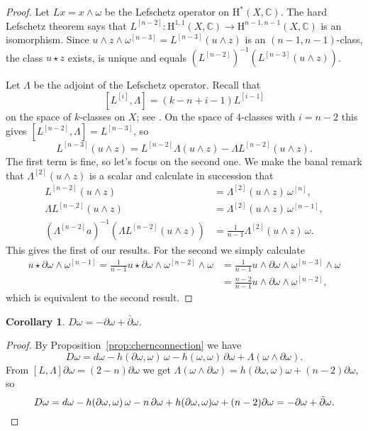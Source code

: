 \documentclass[11pt,a4paper]{amsart}
\newtheorem{coro}[theo]{Corollary}
\theoremstyle{definition}
\theoremstyle{remark}
\newcommand{\CC}{\mathbb{C}}
\def\d{\partial}
\def\dbar{\bar\partial}
\def\coho#1{\mathrm{H}^{#1}}
\def\chern{D}
\def\kf{\omega}
\def\ton{u}
\def\tth{z}
\def\^#1{^{[#1]}}
\begin{document}
\begin{proof}
Let $L x = x \wedge \kf$ be the Lefschetz operator on $\coho{*}(X,\CC)$.
The hard Lefschetz theorem says that $L\^{n-2} : \coho{1,1}(X,\CC) \to
\coho{n-1,n-1}(X,\CC)$ is an isomorphism. Since $\ton \wedge \tth \wedge
\kf\^{n-3} = L\^{n-3}(\ton \wedge \tth)$ is an $(n-1,n-1)$-class, the
class $\ton \star \tth$ exists, is unique and equals
$(L\^{n-2})^{-1}(L\^{n-3}(\ton \wedge \tth))$.

Let $\Lambda$ be the adjoint of the Lefschetz operator. Recall that
$$
[L\^i, \Lambda] = (k - n + i - 1) L\^{i-1}
$$
on the space of $k$-classes on $X$; see
\cite[Corollary~1.64]{HuybrechtsGeometry}. On the space of $4$-classes
with $i = n-2$ this gives $[L\^{n-2}, \Lambda] = L\^{n-3}$, so
$$
L\^{n-3}(\ton \wedge \tth)
= L\^{n-2}\Lambda(\ton \wedge \tth) 
- \Lambda L\^{n-2}(\ton \wedge \tth).
$$
The first term is fine, so let's focus on the second one. We make the
banal remark that $\Lambda\^2(\ton \wedge \tth)$ is a scalar and
calculate in succession that
\begin{align*}
L\^{n-2}(\ton \wedge \tth) 
&= \Lambda\^{2}(\ton \wedge \tth)\, \kf\^n,
\\
\Lambda L\^{n-2}(\ton \wedge \tth) 
&= \Lambda\^{2}(\ton \wedge \tth)\, \kf\^{n-1},
\\
(\Lambda\^{n-2}a)^{-1}(\Lambda L\^{n-2}(\ton \wedge \tth) )
&= \tfrac{1}{n-1} \Lambda\^{2}(\ton \wedge \tth)\, \kf.
\end{align*}
This gives the first of our results. For the second we simply calculate
\begin{align*}
\ton \star \d\kf \wedge \kf\^{n-1}
= \frac{1}{n-1} \ton \star \d\kf \wedge \kf\^{n-2} \wedge \kf
&= \frac{1}{n-1} \ton \wedge \d\kf \wedge \kf\^{n-3} \wedge \kf
\\
&= \frac{n-2}{n-1} \ton \wedge \d\kf \wedge \kf\^{n-2},
\end{align*}
which is equivalent to the second result.
\end{proof}


\begin{coro}
\label{coro:kahlerform}
\hfil
$\chern \kf = -\d\kf + \dbar\kf$.
\hfil
\end{coro}


\begin{proof}
By Proposition~\ref{prop:chernconnection} we have 
$$
\chern \kf = 
d\kf
- h(\d \kf, \kf)\, \kf 
- h (\kf, \kf)\, \d\kf 
+ \Lambda(\kf \wedge \d\kf).
$$
From $[L,\Lambda] \d\kf = (2-n)\d\kf$ we get $\Lambda (\kf \wedge \d\kf) =
h(\d\kf,\kf)\kf + (n-2) \d\kf$, so
$$
D \kf = 
d\kf
- h(\d \kf, \kf)\, \kf 
- n\, \d\kf 
+ h(\d\kf,\kf)\kf + (n-2) \d\kf
= -\d\kf + \dbar\kf.
\qedhere
$$
\end{proof}
\end{document}
